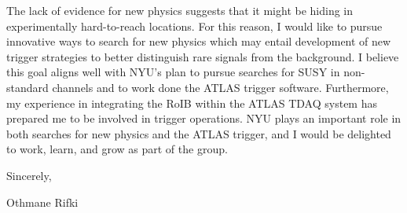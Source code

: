 \documentclass[a4paper]{article}
\begin{document}
The lack of evidence for new physics suggests that 
it might be hiding in experimentally hard-to-reach locations. For this reason, I would like to pursue
innovative ways to search for new physics which may entail development of new trigger strategies to better distinguish 
rare signals from the background. I believe this goal aligns well 
with NYU's plan to pursue searches for SUSY in non-standard channels and to work done the ATLAS trigger software. 
Furthermore, my experience in integrating the 
RoIB within the ATLAS TDAQ system has prepared me to be involved in trigger operations. 
NYU plays an important role in both searches for new physics and the ATLAS trigger, and I would be delighted to work,
learn, and grow as part of the group.

\vspace{0.25cm}

Sincerely,

\vspace{0.25cm}
Othmane Rifki
\end{document}

